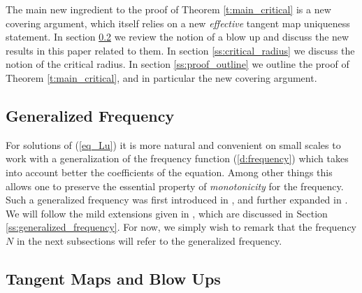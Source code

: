 \documentclass[11pt]{article}
\begin{document}
The main new ingredient to the proof of Theorem \ref{t:main_critical} is a new covering argument, which itself relies on a new {\it effective} tangent map uniqueness statement.  In section \ref{ss:tangent_maps} we review the notion of a blow up and discuss the new results in this paper related to them.  In section \ref{ss:critical_radius} we discuss the notion of the critical radius.  In section \ref{ss:proof_outline} we outline the proof of Theorem \ref{t:main_critical}, and in particular the new covering argument. 

\subsection{Generalized Frequency}

For solutions of (\ref{eq_Lu}) it is more natural and convenient on small scales to work with a generalization of the frequency function (\ref{d:frequency}) which takes into account better the coefficients of the equation.  Among other things this allows one to preserve the essential property of {\it monotonicity} for the frequency.  Such a generalized frequency was first introduced in \cite{galin1,galin2,hanlin}, and further expanded in \cite{chnava}.  We will follow the mild extensions given in \cite{chnava}, which are discussed in Section \ref{ss:generalized_frequency}.  For now, we simply wish to remark that the frequency $N$ in the next subsections will refer to the generalized frequency.

\subsection{Tangent Maps and Blow Ups}\label{ss:tangent_maps}
\end{document}
